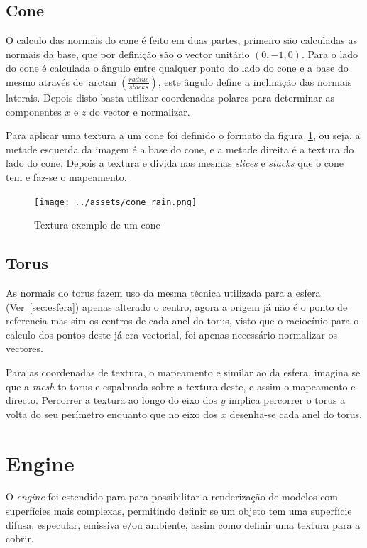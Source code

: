 \documentclass[a4paper]{article}
\begin{document}
\subsection{Cone}
O calculo das normais do cone é feito em duas partes, primeiro são calculadas
as normais da base, que por definição são o vector unitário $(0,-1,0)$. Para o
lado do cone é calculada o ângulo entre qualquer ponto do lado do cone e a base
do mesmo através de $\arctan(\frac{radius}{stacks})$, este ângulo define a
inclinação das normais laterais. Depois disto basta utilizar coordenadas polares
para determinar as componentes $x$ e $z$ do vector e normalizar.

Para aplicar uma textura a um cone foi definido o formato da
figura~\ref{fig:conetexture}, ou seja, a metade esquerda da imagem é a base do
cone, e a metade direita é a textura do lado do cone. Depois a textura e divida
nas mesmas \textit{slices} e \textit{stacks} que o cone tem e faz-se o
mapeamento.

\begin{figure}[H]
    \centering
    \texttt{[image: ../assets/cone\_rain.png]}
    \caption{Textura exemplo de um cone}\label{fig:conetexture}
\end{figure}

\subsection{Torus}
As normais do torus fazem uso da mesma técnica utilizada para a esfera
(Ver~\ref{sec:esfera}) apenas alterado o centro, agora a origem já não é o
ponto de referencia mas sim os centros de cada anel do torus, visto que o
raciocínio para o calculo dos pontos deste já era vectorial, foi apenas
necessário normalizar os vectores.

Para as coordenadas de textura, o mapeamento e similar ao da esfera, imagina se
que a \textit{mesh} to torus e espalmada sobre a textura deste, e assim o
mapeamento e directo. Percorrer a textura ao longo do eixo dos $y$ implica
percorrer o torus a volta do seu perímetro enquanto que no eixo dos $x$
desenha-se cada anel do torus.

\section{Engine}

O \textit{engine} foi estendido para para possibilitar a renderização de
modelos com superfícies mais complexas, permitindo definir se um objeto tem uma
superfície difusa, especular, emissiva e/ou ambiente, assim como definir uma
textura para a cobrir.
\end{document}
